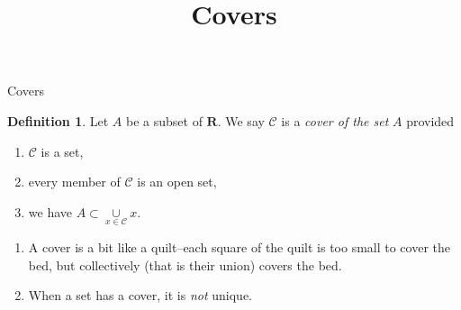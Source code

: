 \documentclass[fleqn]{beamer}
\title{\textbf{Covers}}
\newcommand{\reals}{\mathbf{R}}
\newcommand{\cover}{\mathcal{C}}
\theoremstyle{definition}
\newtheorem{mydef}{Definition}
\newenvironment{snowflakelist}{
  \begin{enumerate}[\textleaf]
 }
  {\end{enumerate}}
\begin{document}
\frame{\titlepage}

\begin{frame}{Covers}

  \begin{mydef} Let \(A\) be a subset of \(\reals\).  We say \(\cover\) is a \emph{cover of the set} \(A\) provided
    \begin{enumerate}
      \item \(\cover\) is a set,
      \item every member of \(\cover\) is an open set,
      \item we have \(A \subset \underset{x \in \cover}{\cup} x\).
    \end{enumerate}


  \end{mydef}

  \begin{snowflakelist}
    \item A cover is a bit like a quilt--each square of the quilt is too small to cover the bed, but collectively (that is their union) covers the bed.
    \item When a set has a cover, it is \emph{not} unique.
  \end{snowflakelist}

\end{frame}
\end{document}
